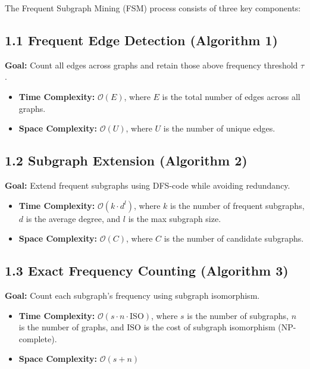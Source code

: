 \documentclass[10pt]{article}
\begin{document}
The Frequent Subgraph Mining (FSM) process consists of three key components:

\subsection*{1.1 Frequent Edge Detection (Algorithm 1)}
\textbf{Goal:} Count all edges across graphs and retain those above frequency threshold $\tau$.

\begin{itemize}[noitemsep]
    \item \textbf{Time Complexity:} $\mathcal{O}(E)$, where $E$ is the total number of edges across all graphs.
    \item \textbf{Space Complexity:} $\mathcal{O}(U)$, where $U$ is the number of unique edges.
\end{itemize}

\subsection*{1.2 Subgraph Extension (Algorithm 2)}
\textbf{Goal:} Extend frequent subgraphs using DFS-code while avoiding redundancy.

\begin{itemize}[noitemsep]
    \item \textbf{Time Complexity:} $\mathcal{O}(k \cdot d^l)$, where $k$ is the number of frequent subgraphs, $d$ is the average degree, and $l$ is the max subgraph size.
    \item \textbf{Space Complexity:} $\mathcal{O}(C)$, where $C$ is the number of candidate subgraphs.
\end{itemize}

\subsection*{1.3 Exact Frequency Counting (Algorithm 3)}
\textbf{Goal:} Count each subgraph’s frequency using subgraph isomorphism.

\begin{itemize}[noitemsep]
    \item \textbf{Time Complexity:} $\mathcal{O}(s \cdot n \cdot \text{ISO})$, where $s$ is the number of subgraphs, $n$ is the number of graphs, and $\text{ISO}$ is the cost of subgraph isomorphism (NP-complete).
    \item \textbf{Space Complexity:} $\mathcal{O}(s + n)$
\end{itemize}
\end{document}
